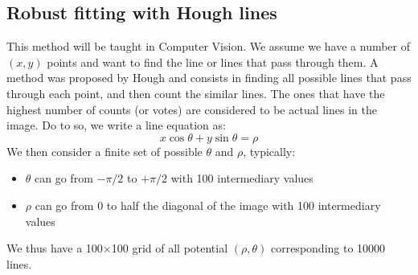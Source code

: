 \documentclass{ecnreport}
\begin{document}
%  
 
 
 \subsection{Robust fitting with Hough lines}
 
 This method will be taught in Computer Vision. We assume we have a number of $(x,y)$ points and want to find the line or lines that pass through them.
 A method was proposed by Hough and consists in finding all possible lines that pass through each point, and then count the similar lines. The ones that have
 the highest number of counts (or votes) are considered to be actual lines in the image.
 Do to so, we write a line equation as:
 \begin{equation*}
  x\cos\theta + y\sin\theta = \rho
 \end{equation*}We then consider a finite set of possible $\theta$ and $\rho$, typically:
 \begin{itemize}
  \item $\theta$ can go from $-\pi/2$ to $+\pi/2$ with 100 intermediary values
  \item $\rho$ can go from 0 to half the diagonal of the image with 100 intermediary values
 \end{itemize}
 We thus have a 100$\times$100 grid of all potential $(\rho,\theta)$ corresponding to 10000 lines.
 
\end{document}

